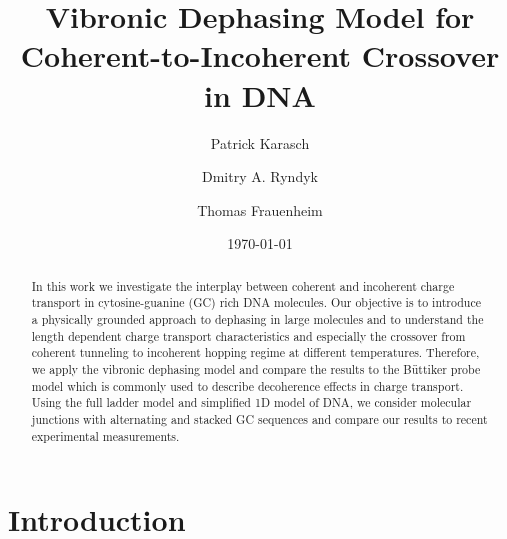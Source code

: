 \documentclass[reprint,superscriptaddress,nofootinbib,amsmath,amssymb,prb,floatfix]{revtex4-1}
\begin{document}
\title{Vibronic Dephasing Model for Coherent-to-Incoherent Crossover in DNA}

\author{Patrick Karasch}
 
\author{Dmitry A. Ryndyk}
	
\author{Thomas Frauenheim}

\date{\today}

\begin{abstract}
  In this work we investigate the interplay between coherent and incoherent charge transport in
  cytosine-guanine (GC) rich DNA molecules. Our objective is to introduce a physically grounded
  approach to dephasing in large molecules and to understand the length dependent charge transport
  characteristics and especially the crossover from coherent tunneling to incoherent hopping regime
  at different temperatures. Therefore, we apply the vibronic dephasing model and compare the
  results to the B\"uttiker probe model which is commonly used to describe decoherence effects in
  charge transport. Using the full ladder model and simplified 1D model of DNA, we consider
  molecular junctions with alternating and stacked GC sequences and compare our results to recent
  experimental measurements.
\end{abstract}


\maketitle


\section{Introduction}
\end{document}
